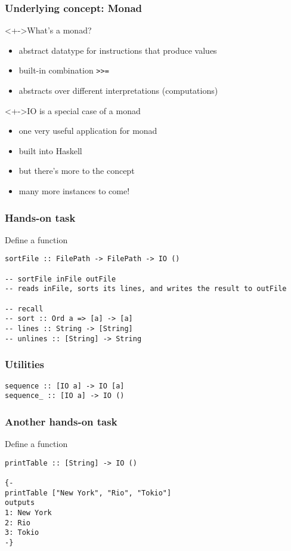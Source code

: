 \documentclass{beamer}
\begin{document}
\begin{frame}
  \frametitle{Underlying concept: \textbf{Monad}}

  \begin{block}<+->{What's a monad?}
    \begin{itemize}
    \item abstract datatype for instructions that produce values
    \item built-in combination \texttt{>>=}
    \item abstracts over different interpretations (computations)
    \end{itemize}
  \end{block}
  \begin{alertblock}<+->{IO is a special case of a monad}
    \begin{itemize}
    \item one very useful application for monad
    \item built into Haskell
    \item but there's more to the concept
    \item many more instances to come!
    \end{itemize}
  \end{alertblock}
\end{frame}
\begin{frame}[fragile]
  \frametitle{Hands-on task}
  Define a function
\begin{lstlisting}
sortFile :: FilePath -> FilePath -> IO ()

-- sortFile inFile outFile 
-- reads inFile, sorts its lines, and writes the result to outFile

-- recall
-- sort :: Ord a => [a] -> [a]
-- lines :: String -> [String]
-- unlines :: [String] -> String
\end{lstlisting}
\end{frame}
\begin{frame}[fragile]
  \frametitle{Utilities}
\begin{lstlisting}
sequence :: [IO a] -> IO [a]
sequence_ :: [IO a] -> IO ()
\end{lstlisting}
\end{frame}
\begin{frame}[fragile]
  \frametitle{Another hands-on task}
  Define a function
\begin{lstlisting}
printTable :: [String] -> IO ()

{-
printTable ["New York", "Rio", "Tokio"]
outputs
1: New York
2: Rio
3: Tokio
-} 
\end{lstlisting}
\end{frame}
\end{document}
